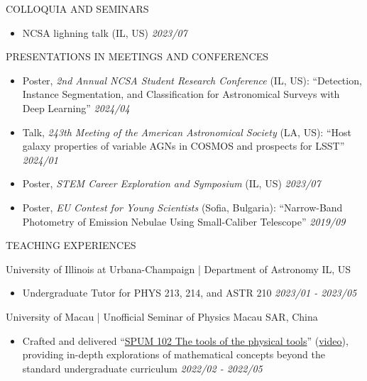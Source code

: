 \documentclass[11pt]{article} %
\begin{document}
\begin{section}{COLLOQUIA AND SEMINARS}

\begin{itemize}[leftmargin=1.5em]
    \item NCSA lighning talk (IL, US) \hfill \textit{2023/07} 
\end{itemize}

\end{section}

\begin{section}{PRESENTATIONS IN MEETINGS AND CONFERENCES}

\begin{itemize}[leftmargin=1.5em]
    \item Poster, \textit{2nd Annual NCSA Student Research Conference} (IL, US): ``Detection, Instance Segmentation, and Classification for Astronomical Surveys with Deep Learning'' \hfill \textit{2024/04} 
    \item Talk, \textit{243th Meeting of the American Astronomical Society} (LA, US): ``Host galaxy properties of variable AGNs in COSMOS and prospects for LSST'' \hfill \textit{2024/01} 
    \item Poster, \textit{STEM Career Exploration and Symposium} (IL, US) \hfill \textit{2023/07} 
    \item Poster, \textit{EU Contest for Young Scientists} (Sofia, Bulgaria): ``Narrow-Band Photometry of Emission Nebulae Using Small-Caliber Telescope'' \hfill \textit{2019/09} 
\end{itemize}

\end{section}

\begin{section}{TEACHING EXPERIENCES}

University of Illinois at Urbana-Champaign | Department of Astronomy \hfill IL, US
\begin{itemize}[leftmargin=1.5em]
    \item Undergraduate Tutor for PHYS 213, 214, and ASTR 210 \hfill \textit{2023/01 - 2023/05}
\end{itemize}

University of Macau | Unofficial Seminar of Physics \hfill Macau SAR, China
\begin{itemize}[leftmargin=1.5em]
    \item Crafted and delivered ``\href{https://github.com/Chisen-Lupus/Seminar-of-Physics-UM/blob/main/SPUM%20102%20The%20tools%20of%20physical%20tool.pdf}{SPUM 102 The tools of the physical tools}'' (\href{https://www.youtube.com/watch?v=nQkv03r-XeQ&list=PLV9fHDZW7hHWQ9rrAk7c9kdeV-Lqyt7pV&index=10}{video}), providing in-depth explorations of mathematical concepts beyond the standard undergraduate curriculum \hfill \textit{2022/02 - 2022/05}
\end{itemize}

\end{section}
\end{document}
